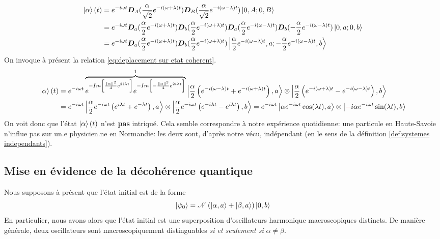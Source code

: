 \documentclass[11pt,oneside,a4paper]{article}
\begin{document}
\begin{align*}
  \ket{\alpha}(t) &= e^{-i\omega t}\bm{D}_A(\frac{\alpha}{\sqrt{2}}e^{-i\left(\omega+\lambda\right)t})\bm{D}_B(\frac{\alpha}{\sqrt{2}}e^{-i\left(\omega-\lambda\right)t})\ket{0,A;0,B}\\
  &= e^{-i\omega t}\bm{D}_a(\frac{\alpha}{2}e^{-i\left(\omega+\lambda\right)t})\bm{D}_b(\frac{\alpha}{2}e^{-i\left(\omega+\lambda\right)t})\bm{D}_a(\frac{\alpha}{2}e^{-i\left(\omega-\lambda\right)t})\bm{D}_b(-\frac{\alpha}{2}e^{-i\left(\omega-\lambda\right)t})\ket{0,a;0,b}\\
  &= e^{-i\omega t}\bm{D}_a(\frac{\alpha}{2}e^{-i\left(\omega+\lambda\right)t})\bm{D}_b(\frac{\alpha}{2}e^{-i\left(\omega+\lambda\right)t})\ket{\frac{\alpha}{2}e^{-i\left(\omega-\lambda\right)t},a;-\frac{\alpha}{2}e^{-i\left(\omega-\lambda\right)t},b}
\end{align*}
On invoque à présent la relation \eqref{eq:deplacement sur etat coherent}.
\begin{align*}
  \ket{\alpha}(t) &= e^{-i\omega t}\overbrace{e^{-Im\left[\frac{\norm{\alpha}^2}{4}e^{2i\lambda t}\right]}e^{-Im\left[-\frac{\norm{\alpha}^2}{4}e^{2i\lambda t}\right]}}^1\ket{\frac{\alpha}{2}\left(e^{-i\left(\omega-\lambda\right)t}+e^{-i\left(\omega+\lambda\right)t}\right),a}\otimes\ket{\frac{\alpha}{2}\left(e^{-i\left(\omega+\lambda\right)t}-e^{-i\left(\omega-\lambda\right)t}\right),b}\\
  &= e^{-i\omega t}\ket{\frac{\alpha}{2}e^{-i\omega t}\left(e^{i\lambda t}+e^{-\lambda t}\right),a}\otimes\ket{\frac{\alpha}{2}e^{-i\omega t}\left(e^{-i\lambda t}-e^{i\lambda t}\right),b} = e^{-i\omega t}\ket{\alpha e^{-i\omega t}\cos(\lambda t),a}\otimes\ket{\color{red}-\color{black}i\alpha e^{-i\omega t}\sin(\lambda t),b}
\end{align*}
On voit donc que l'état $\ket{\alpha}(t)$ n'est \textbf{pas} intriqué. Cela semble correspondre à notre expérience quotidienne: une particule en Haute-Savoie n'influe pas sur un.e physicien.ne en Normandie: les deux sont, d'après notre vécu, indépendant (en le sens de la définition \ref{def:systemes independants}).

\subsection{Mise en évidence de la décohérence quantique}
Nous supposons à présent que l'état initial est de la forme
\begin{equation}
  \ket{\psi_0} = \mathcal{N}\left(\ket{\alpha,a}+\ket{\beta,a}\right)\ket{0,b}
\end{equation}
En particulier, nous avons alors que l'état initial est une superposition d'oscillateurs harmonique macroscopiques distincts. De manière générale, deux oscillateurs sont macroscopiquement distinguables \emph{si et seulement si} $\alpha\neq\beta$.
\end{document}
